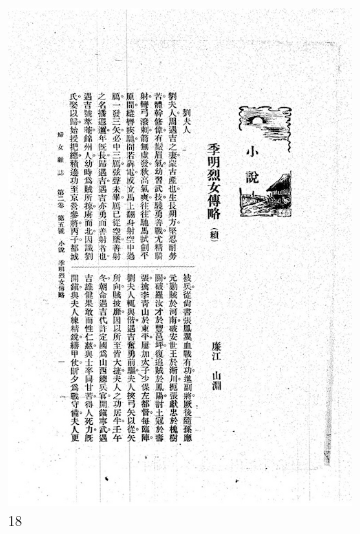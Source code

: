 \documentclass[12pt,twoside]{report}
\begin{document}
\begin{appendices}
\begin{figure}[htbp]
\begin{subfigure}[b]{0.23\linewidth}
        \includegraphics[width=\linewidth]{./figures/testset/18.jpg}
        \caption{18}
        \label{fig:test_18}
    \end{subfigure}
    \hfill
    \begin{subfigure}[b]{0.23\linewidth}

\end{subfigure}
\end{figure}
\end{appendices}
\end{document}
